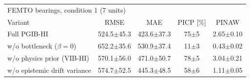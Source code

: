 \begin{tabular}{l c c c c}
\hline
\multicolumn{5}{l}{FEMTO bearings, condition 1 (7 units)}\\
 Variant & RMSE & MAE & PICP [\%] & PINAW \\
\hline
Full PGIB-HI & 524.5$\pm$45.3 & 423.6$\pm$37.3 & 75$\pm$5 & 2.65$\pm$0.10 \\
w/o bottleneck ($\beta=0$) & 652.2$\pm$35.6 & 530.9$\pm$37.4 & 11$\pm$3 & 0.43$\pm$0.02 \\
w/o physics prior (VIB-HI) & 570.1$\pm$56.0 & 471.0$\pm$50.7 & 78$\pm$5 & 3.04$\pm$0.21 \\
w/o epistemic drift variance & 574.7$\pm$52.5 & 445.3$\pm$48.5 & 58$\pm$6 & 1.11$\pm$0.05 \\
\hline
\end{tabular}
